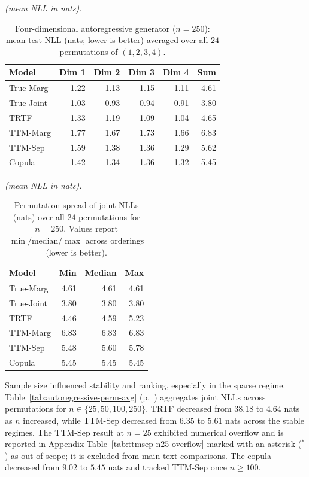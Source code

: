 \documentclass[11pt,a4paper,twoside]{book}\usepackage[]{graphicx}\usepackage[]{xcolor}
\begin{document}
\begin{table}[htbp]
  \centering
  \textit{(mean NLL in nats).}
  \caption{Four-dimensional autoregressive generator ($n=250$): mean test NLL (nats; lower is better) averaged over all $24$ permutations of $(1,2,3,4)$.}
  \label{tab:autoregressive-perm}
  \begin{tabular}{lrrrrr}
    \hline
    Model & Dim 1 & Dim 2 & Dim 3 & Dim 4 & Sum \\
    \hline
    True-Marg        & 1.22 & 1.13 & 1.15 & 1.11 & 4.61 \\
    True-Joint       & 1.03 & 0.93 & 0.94 & 0.91 & 3.80 \\
    TRTF               & 1.33 & 1.19 & 1.09 & 1.04 & 4.65 \\
    TTM-Marg           & 1.77 & 1.67 & 1.73 & 1.66 & 6.83 \\
    TTM-Sep            & 1.59 & 1.38 & 1.36 & 1.29 & 5.62 \\
    Copula             & 1.42 & 1.34 & 1.36 & 1.32 & 5.45 \\
    \hline
  \end{tabular}
\end{table}

\begin{table}[htbp]
  \centering
  \textit{(mean NLL in nats).}
  \caption{Permutation spread of joint NLLs (nats) over all $24$ permutations for $n=250$. Values report $\min/\mathrm{median}/\max$ across orderings (lower is better).}
  \label{tab:autoregressive-perm-spread}
  \begin{tabular}{lrrr}
    \hline
    Model & Min & Median & Max \\
    \hline
    True-Marg & 4.61 & 4.61 & 4.61 \\
    True-Joint & 3.80 & 3.80 & 3.80 \\
    TRTF & 4.46 & 4.59 & 5.23 \\
    TTM-Marg & 6.83 & 6.83 & 6.83 \\
    TTM-Sep & 5.48 & 5.60 & 5.78 \\
    Copula & 5.45 & 5.45 & 5.45 \\
    \hline
  \end{tabular}
\end{table}

Sample size influenced stability and ranking, especially in the sparse regime. Table~\ref{tab:autoregressive-perm-avg} (p.~\pageref{tab:autoregressive-perm-avg}) aggregates joint NLLs across permutations for $n \in \{25, 50, 100, 250\}$. TRTF decreased from $38.18$ to $4.64$ nats as $n$ increased, while TTM-Sep decreased from $6.35$ to $5.61$ nats across the stable regimes. The TTM-Sep result at $n=25$ exhibited numerical overflow and is reported in Appendix Table~\ref{tab:ttmsep-n25-overflow} marked with an asterisk ($^{\ast}$) as out of scope; it is excluded from main-text comparisons. The copula decreased from $9.02$ to $5.45$ nats and tracked TTM-Sep once $n \ge 100$.
\end{document}
